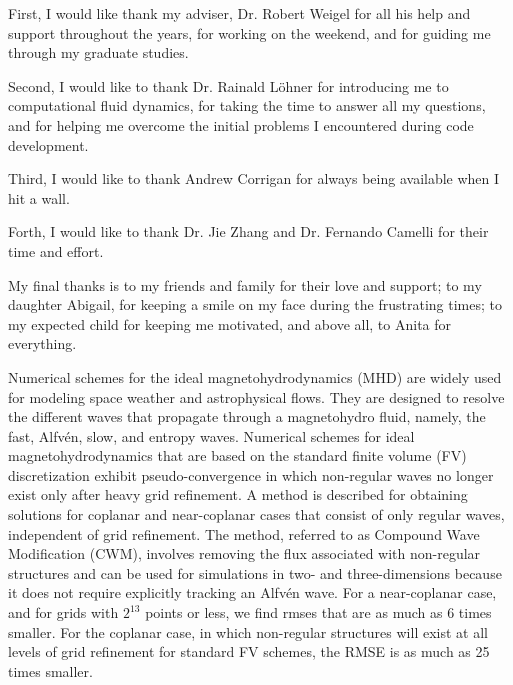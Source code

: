 \documentclass[11pt]{report}
\begin{document}

\acknowledgementspage

\noindent First, I would like thank my adviser, Dr. Robert Weigel for all his help and support throughout the years, for working on the weekend, and for guiding me through my graduate studies. 

Second, I would like to thank Dr. Rainald L{\"o}hner for introducing me to computational fluid dynamics, for taking the time to answer all my questions, and for helping me overcome the initial problems I encountered during code development.  

Third, I would like to thank Andrew Corrigan for always being available when I hit a wall.

Forth, I would like to thank Dr. Jie Zhang and Dr. Fernando Camelli for their time and effort. 
 
My final thanks is to my friends and family for their love and support; to my daughter Abigail, for keeping a smile on my face during the frustrating times; to my expected child for keeping me motivated, and above all, to Anita for everything.


\tableofcontents

\listoftables

\listoffigures

\abstractpage

Numerical schemes for the ideal magnetohydrodynamics (MHD) are widely used for modeling space weather and astrophysical flows.  They are designed to resolve the different waves that propagate through a magnetohydro fluid, namely, the fast, Alfv{\'e}n, slow, and entropy waves.  Numerical schemes for ideal magnetohydrodynamics that are based on the standard finite volume (FV) discretization exhibit pseudo-convergence in which non-regular waves no longer exist only after heavy grid refinement.  A method is described for obtaining solutions for coplanar and near-coplanar cases that consist of only regular waves, independent of grid refinement.  The method, referred to as Compound Wave Modification (CWM), involves removing the flux associated with non-regular structures and can be used for simulations in two- and three-dimensions because it does not require explicitly tracking an Alfv{\'e}n wave.  For a near-coplanar case, and for grids with $2^{13}$ points or less, we find \glspl{rmse} that are as much as 6 times smaller.  For the coplanar case, in which non-regular structures will exist at all levels of grid refinement for standard FV schemes, the RMSE is as much as 25 times smaller.  
 
\end{document}
